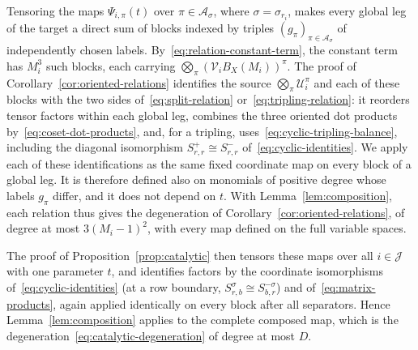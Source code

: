 Tensoring the maps \(\Psi_{i,\pi}(t)\) over \(\pi\in\mathcal A_\sigma\),
where \(\sigma=\sigma_{r_i}\), makes every global leg of the target a
direct sum of blocks indexed by triples \((g_\pi)_{\pi\in\mathcal
A_\sigma}\) of independently chosen labels.
By~\eqref{eq:relation-constant-term}, the constant term has \(M_i^3\) such
blocks, each carrying \(\bigotimes_\pi(\mathcal V_iB_X(M_i))^\pi\). The
proof of Corollary~\ref{cor:oriented-relations} identifies the source
\(\bigotimes_\pi\mathcal U_i^\pi\) and each of these blocks with the two
sides of~\eqref{eq:split-relation} or~\eqref{eq:tripling-relation}: it
reorders tensor factors within each global leg, combines the three
oriented dot products by~\eqref{eq:coset-dot-products}, and, for a
tripling, uses~\eqref{eq:cyclic-tripling-balance}, including the diagonal
isomorphism \(S^+_{r,r}\cong S^-_{r,r}\) of~\eqref{eq:cyclic-identities}.
We apply each of these identifications as the same fixed coordinate map
on every block of a global leg. It is therefore defined also on monomials
of positive degree whose labels \(g_\pi\) differ, and it does not depend
on \(t\). With Lemma~\ref{lem:composition}, each relation thus gives the
degeneration of Corollary~\ref{cor:oriented-relations}, of degree at most
\(3(M_i-1)^2\), with every map defined on the full variable spaces.

The proof of Proposition~\ref{prop:catalytic} then tensors these maps over
all \(i\in\mathcal J\) with one parameter \(t\), and identifies factors
by the coordinate isomorphisms of~\eqref{eq:cyclic-identities} (at a row
boundary, \(S^\sigma_{r,b}\cong S^{-\sigma}_{b,r}\)) and
of~\eqref{eq:matrix-products}, again applied identically on every block
after all separators. Hence Lemma~\ref{lem:composition} applies to the
complete composed map, which is the
degeneration~\eqref{eq:catalytic-degeneration} of degree at most \(D\).
